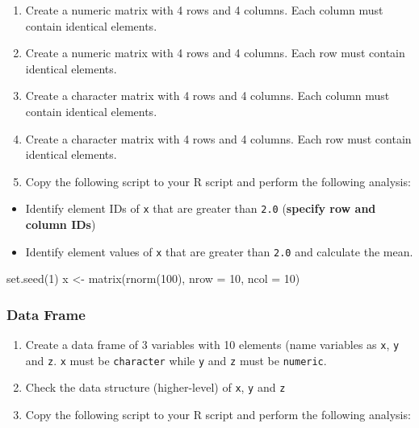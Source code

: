 \documentclass[
]{article}
\newenvironment{Shaded}{\begin{snugshade}}{\end{snugshade}}
\newcommand{\AttributeTok}[1]{\textcolor[rgb]{0.77,0.63,0.00}{#1}}
\newcommand{\DecValTok}[1]{\textcolor[rgb]{0.00,0.00,0.81}{#1}}
\newcommand{\FunctionTok}[1]{\textcolor[rgb]{0.00,0.00,0.00}{#1}}
\newcommand{\NormalTok}[1]{#1}
\newcommand{\OtherTok}[1]{\textcolor[rgb]{0.56,0.35,0.01}{#1}}
\providecommand{\tightlist}{%
  \setlength{\itemsep}{0pt}\setlength{\parskip}{0pt}}
\begin{document}
\begin{enumerate}
\def\labelenumi{\alph{enumi}.}
\tightlist
\item
  Create a numeric matrix with 4 rows and 4 columns. Each column must contain identical elements.
\item
  Create a numeric matrix with 4 rows and 4 columns. Each row must contain identical elements.
\item
  Create a character matrix with 4 rows and 4 columns. Each column must contain identical elements.
\item
  Create a character matrix with 4 rows and 4 columns. Each row must contain identical elements.
\item
  Copy the following script to your R script and perform the following analysis:
\end{enumerate}

\begin{itemize}
\tightlist
\item
  Identify element IDs of \texttt{x} that are greater than \texttt{2.0} (\textbf{specify row and column IDs})
\item
  Identify element values of \texttt{x} that are greater than \texttt{2.0} and calculate the mean.
\end{itemize}

\begin{Shaded}
\begin{Highlighting}[]
\FunctionTok{set.seed}\NormalTok{(}\DecValTok{1}\NormalTok{)}
\NormalTok{x }\OtherTok{\textless{}{-}} \FunctionTok{matrix}\NormalTok{(}\FunctionTok{rnorm}\NormalTok{(}\DecValTok{100}\NormalTok{), }\AttributeTok{nrow =} \DecValTok{10}\NormalTok{, }\AttributeTok{ncol =} \DecValTok{10}\NormalTok{)}
\end{Highlighting}
\end{Shaded}

\hypertarget{data-frame-1}{%
\subsubsection{Data Frame}\label{data-frame-1}}

\begin{enumerate}
\def\labelenumi{\alph{enumi}.}
\tightlist
\item
  Create a data frame of 3 variables with 10 elements (name variables as \texttt{x}, \texttt{y} and \texttt{z}. \texttt{x} must be \texttt{character} while \texttt{y} and \texttt{z} must be \texttt{numeric}.
\item
  Check the data structure (higher-level) of \texttt{x}, \texttt{y} and \texttt{z}
\item
  Copy the following script to your R script and perform the following analysis:
\end{enumerate}
\end{document}
